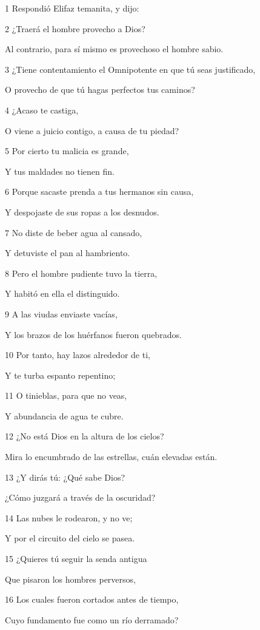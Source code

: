 \par 1 Respondió Elifaz temanita, y dijo:
\par 2 ¿Traerá el hombre provecho a Dios?
\par Al contrario, para sí mismo es provechoso el hombre sabio.
\par 3 ¿Tiene contentamiento el Omnipotente en que tú seas justificado,
\par O provecho de que tú hagas perfectos tus caminos? 
\par 4 ¿Acaso te castiga,
\par O viene a juicio contigo, a causa de tu piedad?
\par 5 Por cierto tu malicia es grande,
\par Y tus maldades no tienen fin.
\par 6 Porque sacaste prenda a tus hermanos sin causa,
\par Y despojaste de sus ropas a los desnudos.
\par 7 No diste de beber agua al cansado,
\par Y detuviste el pan al hambriento.
\par 8 Pero el hombre pudiente tuvo la tierra,
\par Y habitó en ella el distinguido.
\par 9 A las viudas enviaste vacías,
\par Y los brazos de los huérfanos fueron quebrados.
\par 10 Por tanto, hay lazos alrededor de ti,
\par Y te turba espanto repentino;
\par 11 O tinieblas, para que no veas,
\par Y abundancia de agua te cubre.
\par 12 ¿No está Dios en la altura de los cielos?
\par Mira lo encumbrado de las estrellas, cuán elevadas están.
\par 13 ¿Y dirás tú: ¿Qué sabe Dios?
\par ¿Cómo juzgará a través de la oscuridad?
\par 14 Las nubes le rodearon, y no ve;
\par Y por el circuito del cielo se pasea.
\par 15 ¿Quieres tú seguir la senda antigua
\par Que pisaron los hombres perversos,
\par 16 Los cuales fueron cortados antes de tiempo,
\par Cuyo fundamento fue como un río derramado?
